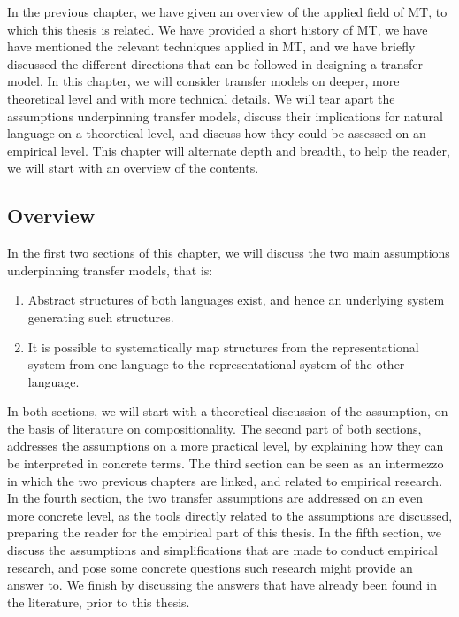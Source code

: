 \documentclass{report}
\theoremstyle{definition}
\theoremstyle{plain}
\begin{document}
In the previous chapter, we have given an overview of the applied field of MT, to which this thesis is related. We have provided a short history of MT, we have have mentioned the relevant techniques applied in MT, and we have briefly discussed the different directions that can be followed in designing a transfer model. In this chapter, we will consider transfer models on deeper, more theoretical level and with more technical details. We will tear apart the assumptions underpinning transfer models, discuss their implications for natural language on a theoretical level, and discuss how they could be assessed on an empirical level. This chapter will alternate depth and breadth, to help the reader, we will start with an overview of the contents.

\subsection*{Overview}

In the first two sections of this chapter, we will discuss the two main assumptions underpinning transfer models, that is:

\begin{enumerate}
\item Abstract structures of both languages exist, and hence an underlying system generating such structures.
\item It is possible to systematically map structures from the representational system from one language to the representational system of the other language.
\end{enumerate}

In both sections, we will start with a theoretical discussion of the assumption, on the basis of literature on compositionality. The second part of both sections, addresses the assumptions on a more practical level, by explaining how they can be interpreted in concrete terms. The third section can be seen as an intermezzo in which the two previous chapters are linked, and related to empirical research. In the fourth section, the two transfer assumptions are addressed on an even more concrete level, as the tools directly related to the assumptions are discussed, preparing the reader for the empirical part of this thesis. In the fifth section, we discuss the assumptions and simplifications that are made to conduct empirical research, and pose some concrete questions such research might provide an answer to. We finish by discussing the answers that have already been found in the literature, prior to this thesis.
\end{document}
